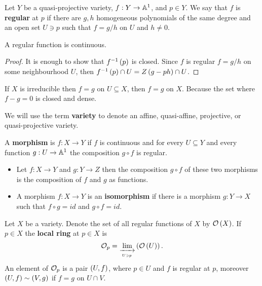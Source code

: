 \begin{definition}
Let $ Y $ be a quasi-projective variety, $ f : Y \to \mathbb{A}^1 $, and $ p \in Y $. We say that $ f $ is \textbf{regular} at $ p $ if there are $ g, h $ homogeneous polynomials of the same degree and an open set $ U \ni p $ such that $ f = g / h $ on $ U $ and $ h \ne 0 $.
\end{definition}

\begin{lemma}
A regular function is continuous.
\end{lemma}

\begin{proof}
It is enough to show that $ f^{-1}\left( p \right) $ is closed. Since $ f $ is regular $ f = g / h $ on some neighbourhood $ U $, then $ f^{-1}\left( p \right) \cap U = Z\left( g - ph \right) \cap U $.
\end{proof}

\begin{remark}
If $ X $ is irreducible then $ f = g $ on $ U \subseteq X $, then $ f = g $ on $ X $. Because the set where $ f - g = 0 $ is closed and dense.
\end{remark}

\begin{definition}
We will use the term \textbf{variety} to denote an affine, quasi-affine, projective, or quasi-projective variety.
\end{definition}

\begin{definition}
A \textbf{morphism} is $ f : X \to Y $ if $ f $ is continuous and for every $ U \subseteq Y $ and every function $ g : U \to \mathbb{A}^1 $ the composition $ g \circ f $ is regular.
\end{definition}

\begin{remark}
\hfill
\begin{itemize}
\item Let $ f : X \to Y $ and $ g : Y \to Z $ then the composition $ g \circ f $ of these two morphisms is the composition of $ f $ and $ g $ as functions.
\item A morphism $ f : X \to Y $ is an \textbf{isomorphism} if there is a morphism $ g : Y \to X $ such that $ f \circ g = id $ and $ g \circ f = id $.
\end{itemize}
\end{remark}

\begin{definition}
Let $ X $ be a variety. Denote the set of all regular functions of $ X $ by $ \mathcal{O}\left( X \right) $. If $ p \in X $ the \textbf{local ring} at $ p \in X $ is
$$ \mathcal{O}_p = \lim_{\xrightarrow[U \ni p]{}}\left( \mathcal{O}\left( U \right) \right). $$
An element of $ \mathcal{O}_p $ is a pair $ \left( U, f \right) $, where $ p \in U $ and $ f $ is regular at $ p $, moreover $ \left( U, f \right) \sim \left( V, g \right) $ if $ f = g $ on $ U \cap V $.
\end{definition}

